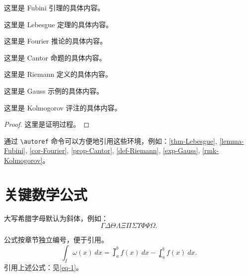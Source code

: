 \documentclass{sysuthesis}
\begin{document}
\begin{lemma}[Fubini] \label{lemma-Fubini}
  这里是 Fubini 引理的具体内容。
\end{lemma}

\begin{theorem}[Lebesgue] \label{thm-Lebesgue}
  这里是 Lebesgue 定理的具体内容。
\end{theorem}

\begin{corollary}[Fourier] \label{cor-Fourier}
  这里是 Fourier 推论的具体内容。
\end{corollary}

\begin{proposition}[Cantor] \label{prop-Cantor}
  这里是 Cantor 命题的具体内容。
\end{proposition}

\begin{definition}[Riemann] \label{def-Riemann}
  这里是 Riemann 定义的具体内容。
\end{definition}

\begin{example}[Gauss] \label{exp-Gauss}
  这里是 Gauss 示例的具体内容。
\end{example}

\begin{remark}[Kolmogorov] \label{rmk-Kolmogorov}
  这里是 Kolmogorov 评注的具体内容。
\end{remark}

\begin{proof}
  这里是证明过程。
\end{proof}

通过 \verb|\autoref| 命令可以方便地引用这些环境，例如：\autoref{thm-Lebesgue}, \autoref{lemma-Fubini}, \autoref{cor-Fourier}, \autoref{prop-Cantor}, \autoref{def-Riemann}, \autoref{exp-Gauss}, \autoref{rmk-Kolmogorov}。

\section{关键数学公式}

大写希腊字母默认为斜体，例如：
\begin{equation*}
  \Gamma \Delta \Theta \Lambda \Xi \Pi \Sigma \Upsilon \Phi \Psi \Omega.
\end{equation*}

公式按章节独立编号，便于引用。
\begin{equation} \label{eq-1}
  \int_I \omega(x)\ dx = \upint_{a}^b f(x)\ dx - \lowint_a^b f(x)\ dx.
\end{equation}
引用上述公式：见\autoref{eq-1}。
\end{document}
